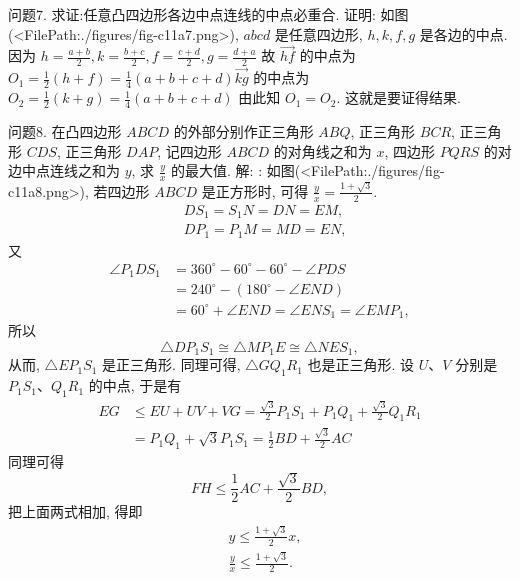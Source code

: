 问题7. 求证:任意凸四边形各边中点连线的中点必重合.
证明: 如图(<FilePath:./figures/fig-c11a7.png>),  $a b c d$ 是任意四边形, $h, k, f, g$ 是各边的中点.
因为 $h=\frac{a+b}{2}, k=\frac{b+c}{2}, f=\frac{c+d}{2}, g=\frac{d+a}{2}$
故 $\overrightarrow{h f}$ 的中点为 $O_1=\frac{1}{2}(h+f)=\frac{1}{4}(a+b+c+d)\overrightarrow{k g}$ 的中点为 $O_2=\frac{1}{2}(k+g)=\frac{1}{4}(a+b+c+d)$
由此知 $O_1=O_2$. 这就是要证得结果.



问题8. 在凸四边形 $A B C D$ 的外部分别作正三角形 $A B Q$, 正三角形 $B C R$, 正三角形 $C D S$, 正三角形 $D A P$, 记四边形 $A B C D$ 的对角线之和为 $x$, 四边形 $P Q R S$ 的对边中点连线之和为 $y$, 求 $\frac{y}{x}$ 的最大值.
解: : 如图(<FilePath:./figures/fig-c11a8.png>), 若四边形 $A B C D$ 是正方形时, 可得 $\frac{y}{x}=\frac{1+\sqrt{3}}{2}$.
$$
\begin{aligned}
& D S_1=S_1 N=D N=E M, \\
& D P_1=P_1 M=M D=E N,
\end{aligned}
$$
又
$$
\begin{aligned}
\angle P_1 D S_1 & =360^{\circ}-60^{\circ}-60^{\circ}-\angle P D S \\
& =240^{\circ}-\left(180^{\circ}-\angle E N D\right) \\
& =60^{\circ}+\angle E N D=\angle E N S_1=\angle E M P_1,
\end{aligned}
$$
所以
$$
\triangle D P_1 S_1 \cong \triangle M P_1 E \cong \triangle N E S_1,
$$
从而, $\triangle E P_1 S_1$ 是正三角形.
同理可得, $\triangle G Q_1 R_1$ 也是正三角形.
设 $U 、 V$ 分别是 $P_1 S_1 、 Q_1 R_1$ 的中点, 于是有
$$
\begin{aligned}
E G & \leqslant E U+U V+V G=\frac{\sqrt{3}}{2} P_1 S_1+P_1 Q_1+\frac{\sqrt{3}}{2} Q_1 R_1 \\
& =P_1 Q_1+\sqrt{3} P_1 S_1=\frac{1}{2} B D+\frac{\sqrt{3}}{2} A C
\end{aligned}
$$
同理可得
$$
F H \leqslant \frac{1}{2} A C+\frac{\sqrt{3}}{2} B D,
$$
把上面两式相加, 得即
$$
\begin{aligned}
& y \leqslant \frac{1+\sqrt{3}}{2} x, \\
& \frac{y}{x} \leqslant \frac{1+\sqrt{3}}{2} .
\end{aligned}
$$



